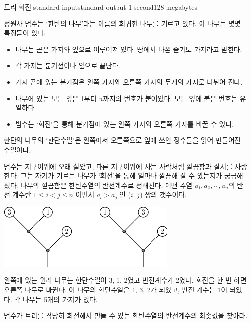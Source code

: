 \begin{problem}{트리 회전}
	{standard input}{standard output}
	{1 second}{128 megabytes}{}
	
	
	정원사 범수는 `한탄의 나무'라는 이름의 희귀한 나무를 기르고 있다. 이 나무는 몇몇 특징들이 있다.
	
\begin{itemize}
\item 나무는 곧은 가지와 잎으로 이루어져 있다. 땅에서 나온 줄기도 가지라고 말한다.
\item 각 가지는 분기점이나 잎으로 끝난다. 
\item 가지 끝에 있는 분기점은 왼쪽 가지와 오른쪽 가지의 두개의 가지로 나뉘어 진다.
\item 나무에 있는 모든 잎은 1부터 $n$까지의 번호가 붙어있다. 모든 잎에 붙은 번호는 유일하다.
\item 범수는 `회전'을 통해 분기점에 있는 왼쪽 가지와 오른쪽 가지를 바꿀 수 있다.
\end{itemize}

한탄의 나무의 `한탄수열'은 왼쪽에서 오른쪽으로 잎에 쓰인 정수들을 읽어 만들어진 수열이다.

범수는 지구이웨에 오래 살았고, 다른 지구이웨에 사는 사람처럼 깔끔함과 질서를 사랑한다. 그는 자기가 기르는 나무가 `회전'을 통해 얼마나 깔끔해 질 수 있는지가 궁금해 졌다. 나무의 깔끔함은 한탄수열의 반전계수로 정해진다. 어떤 수열 $a_1,a_2,\cdots,a_n$의 반전 계수란 $1 \le i < j \le n$ 이면서 $a_i > a_j$ 인 ($i$, $j$) 쌍의 갯수이다.

\vspace{5mm}
\begin{center}
	\includegraphics[]{rot.png}
\end{center}
\vspace{5mm}
	
	왼쪽에 있는 원래 나무는 한탄수열이 3, 1, 2였고 반전계수가 2였다. 회전을 한 번 하면 오른쪽 나무로 바뀐다. 이 나무의 한탄수열은 1, 3, 2가 되었고, 반전 계수는 1이 되었다. 각 나무는 5개의 가지가 있다.
	
	범수가 트리를 적당히 회전해서 만들 수 있는 한탄수열의 반전계수의 최솟값을 찾아라.

	\InputFile
	

\end{problem}
